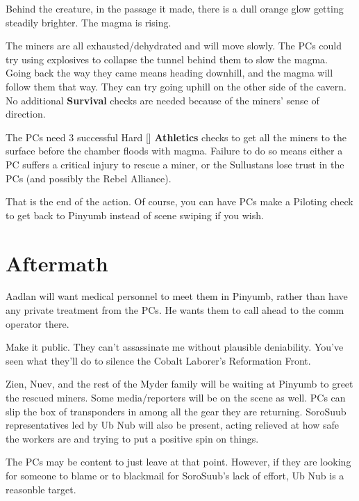 \documentclass{book}
\newcommand{\df}{\difficulty}
\begin{document}
\begin{multicols*}{2}
Behind the creature, in the passage it made, there is a dull orange glow getting steadily brighter. The magma is rising.

The miners are all exhausted/dehydrated and will move slowly. The PCs could try using explosives to collapse the tunnel behind them to slow the magma. Going back the way they came means heading downhill, and the magma will follow them that way. They can try going uphill on the other side of the cavern.  No additional \textbf{Survival} checks are needed because of the miners' sense of direction.

The PCs need 3 successful Hard [\df\df\df] \textbf{Athletics} checks to get all the miners to the surface before the chamber floods with magma.  Failure to do so means either a PC suffers a critical injury to rescue a miner, or the Sullustans lose trust in the PCs (and possibly the Rebel Alliance).

That is the end of the action. Of course, you can have PCs make a Piloting check to get back to Pinyumb instead of scene swiping if you wish.

\section{Aftermath}

Aadlan will want medical personnel to meet them in Pinyumb, rather than have any private treatment from the PCs. He wants them to call ahead to the comm operator there.
\begin{quoting}
Make it public. They can’t assassinate me without plausible deniability.  You’ve seen what they’ll do to silence the Cobalt Laborer’s Reformation Front.
\end{quoting}

Zien, Nuev, and the rest of the Myder family will be waiting at Pinyumb to greet the rescued miners. Some media/reporters will be on the scene as well. PCs can slip the box of transponders in among all the gear they are returning. SoroSuub representatives led by Ub Nub will also be present, acting relieved at how safe the workers are and trying to put a positive spin on things.

The PCs may be content to just leave at that point. However, if they are looking for someone to blame or to blackmail for SoroSuub's lack of effort, Ub Nub is a reasonble target.

\vfill\null
\columnbreak


\end{multicols*}
\end{document}

